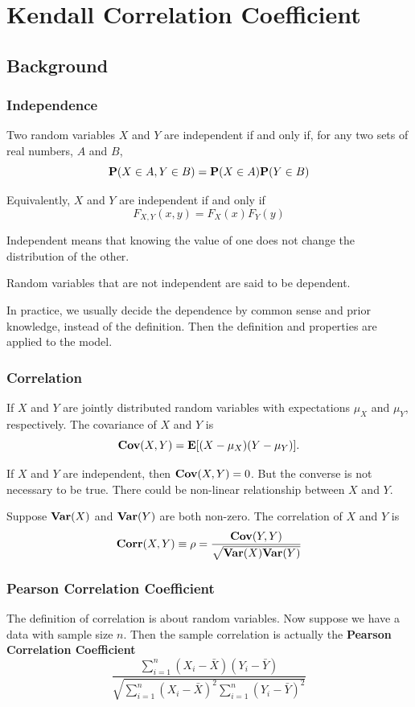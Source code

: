 \section{Kendall Correlation Coefficient}
\subsection{Background}
\subsubsection{Independence}
Two random variables $X$ and $Y$ are independent if and only if, for any two sets of real numbers, $A$ and $B$, 
\[\P (X \in A, Y \in B) = \P(X \in A) \P(Y \in B)\]

Equivalently, $X$ and $Y$ are independent if and only if 
\[F_{X, Y} (x, y) = F_X(x)F_Y(y)\]

Independent means that knowing the value of one does not change the distribution of the other.

Random variables that are not independent are said to be dependent.

In practice, we usually decide the dependence by common sense and prior knowledge, instead of the definition. Then the definition and properties are applied to the model.

\subsubsection{Correlation}
If $X$ and $Y$ are jointly distributed random variables with expectations $\mu_X$ and $\mu_Y$, respectively. The covariance of $X$ and $Y$ is \[\Cov(X, Y) = \E[(X - \mu_X)(Y-\mu_Y)].\]

If $X$ and $Y$ are independent, then $\Cov(X, Y) = 0$. But the converse is not necessary to be true. There could be non-linear relationship between $X$ and $Y$.

Suppose $\Var(X)$ and $\Var(Y)$ are both non-zero. The correlation of $X$ and $Y$ is \[\Corr(X,Y) \equiv \rho = \frac{\Cov(Y, Y)}{\sqrt{\Var(X)\Var(Y)}}\]

\subsubsection{Pearson Correlation Coefficient}
The definition of correlation is about random variables. Now suppose we have a data with sample size $n$. Then the sample correlation is actually the \textbf{Pearson Correlation Coefficient}
\[
\frac
{\sum_{i=1}^{n}
	(X_i - \bar{X})
	(Y_i - \bar{Y})
}
{\sqrt{
		\sum_{i=1}^{n}(X_i - \bar{X})^2 
		\sum_{i=1}^{n}(Y_i - \bar{Y})^2
	} 
}
\]

